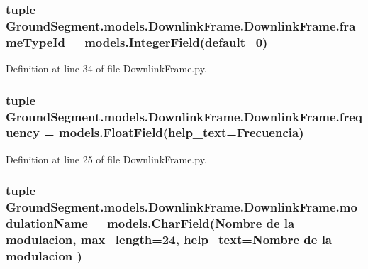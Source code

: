 \subsubsection[{frame\+Type\+Id}]{\setlength{\rightskip}{0pt plus 5cm}tuple Ground\+Segment.\+models.\+Downlink\+Frame.\+Downlink\+Frame.\+frame\+Type\+Id = models.\+Integer\+Field(default=0)\hspace{0.3cm}{\ttfamily [static]}}\label{class_ground_segment_1_1models_1_1_downlink_frame_1_1_downlink_frame_a562b48a3bb48d65dfacef680dc3622b6}


Definition at line 34 of file Downlink\+Frame.\+py.

\hypertarget{class_ground_segment_1_1models_1_1_downlink_frame_1_1_downlink_frame_a417795733873860a43017936b8bb1f6b}{}
\subsubsection[{frequency}]{\setlength{\rightskip}{0pt plus 5cm}tuple Ground\+Segment.\+models.\+Downlink\+Frame.\+Downlink\+Frame.\+frequency = models.\+Float\+Field(help\+\_\+text=\textquotesingle{}Frecuencia\textquotesingle{})\hspace{0.3cm}{\ttfamily [static]}}\label{class_ground_segment_1_1models_1_1_downlink_frame_1_1_downlink_frame_a417795733873860a43017936b8bb1f6b}


Definition at line 25 of file Downlink\+Frame.\+py.

\hypertarget{class_ground_segment_1_1models_1_1_downlink_frame_1_1_downlink_frame_a396f8f6467f927c4cb3e1f24d40b4254}{}
\subsubsection[{modulation\+Name}]{\setlength{\rightskip}{0pt plus 5cm}tuple Ground\+Segment.\+models.\+Downlink\+Frame.\+Downlink\+Frame.\+modulation\+Name = models.\+Char\+Field(\textquotesingle{}Nombre de la modulacion\textquotesingle{}, max\+\_\+length=24, help\+\_\+text=\textquotesingle{}Nombre de la modulacion\textquotesingle{} )\hspace{0.3cm}{\ttfamily [static]}}\label{class_ground_segment_1_1models_1_1_downlink_frame_1_1_downlink_frame_a396f8f6467f927c4cb3e1f24d40b4254}


